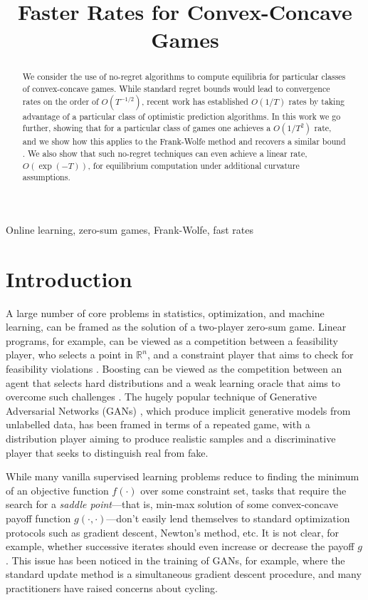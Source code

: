 \documentclass[final,12pt]{colt2018} %
\title[Faster Rates for Convex-Concave Games]{Faster Rates for Convex-Concave Games}
\def\reals{\mathbb{R}}
\def\reals{\mathbb{R}}
\begin{document}
\setcounter{page}{15}

\maketitle
\begin{abstract}
We consider the use of no-regret algorithms to compute equilibria for particular classes of convex-concave games. While standard regret bounds would lead to convergence rates on the order of $O(T^{-1/2})$, recent work \citep{RS13,SALS15} has established $O(1/T)$ rates by taking advantage of a particular class of optimistic prediction algorithms. In this work we go further, showing that for a particular class of games one achieves a $O(1/T^2)$ rate, and we show how this applies to the Frank-Wolfe method and recovers a similar bound \citep{D15}. We also show that such no-regret techniques can even achieve a linear rate, $O(\exp(-T))$, for equilibrium computation under additional curvature assumptions.
\end{abstract}

\begin{keywords}
Online learning, zero-sum games, Frank-Wolfe, fast rates
\end{keywords}

\section{Introduction}

A large number of core problems in statistics, optimization, and machine learning, can be framed as the solution of a two-player zero-sum game. Linear programs, for example, can be viewed as a competition between a feasibility player, who selects a point in $\reals^n$, and a constraint player that aims to check for feasibility violations \citep{Adler2013}. Boosting \citep{freund1999adaptive} can be viewed as the competition between an agent that selects hard distributions and a weak learning oracle that aims to overcome such challenges \citep{freund1996game}. The hugely popular technique of Generative Adversarial Networks (GANs) \citep{goodfellow2014generative}, which produce implicit generative models from unlabelled data, has been framed in terms of a repeated game, with a distribution player aiming to produce realistic samples and a discriminative player that seeks to distinguish real from fake. 

While many vanilla supervised learning problems reduce to finding the minimum of an objective function $f(\cdot)$ over some constraint set, tasks that require the search for a \emph{saddle point}---that is, min-max solution of some convex-concave payoff function $g(\cdot,\cdot)$---don't easily lend themselves to standard optimization protocols such as gradient descent, Newton's method, etc. It is not clear, for example, whether successive iterates should even increase or decrease the payoff $g$. This issue has been noticed in the training of GANs, for example, where the standard update method is a simultaneous gradient descent procedure, and many practitioners have raised concerns about cycling.
\end{document}

